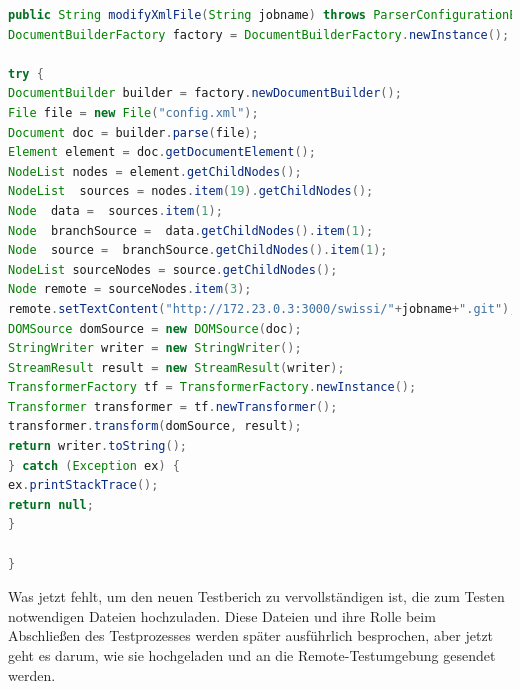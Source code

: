 \documentclass[a4paper,12pt,oneside]{book}
\begin{document}
\begin{lstlisting}[language=JAVA,caption=modifyXmlFil]
public String modifyXmlFile(String jobname) throws ParserConfigurationException, SAXException, IOException {
DocumentBuilderFactory factory = DocumentBuilderFactory.newInstance();

try {
DocumentBuilder builder = factory.newDocumentBuilder();
File file = new File("config.xml");
Document doc = builder.parse(file);
Element element = doc.getDocumentElement();
NodeList nodes = element.getChildNodes();
NodeList  sources = nodes.item(19).getChildNodes();
Node  data =  sources.item(1);
Node  branchSource =  data.getChildNodes().item(1);
Node  source =  branchSource.getChildNodes().item(1);
NodeList sourceNodes = source.getChildNodes();
Node remote = sourceNodes.item(3);
remote.setTextContent("http://172.23.0.3:3000/swissi/"+jobname+".git");
DOMSource domSource = new DOMSource(doc);
StringWriter writer = new StringWriter();
StreamResult result = new StreamResult(writer);
TransformerFactory tf = TransformerFactory.newInstance();
Transformer transformer = tf.newTransformer();
transformer.transform(domSource, result);
return writer.toString();    
} catch (Exception ex) {
ex.printStackTrace();
return null;
}

}
\end{lstlisting} 
Was jetzt fehlt, um den neuen Testberich zu vervollständigen ist, die zum Testen notwendigen Dateien hochzuladen. Diese Dateien und ihre Rolle beim Abschließen des Testprozesses werden später ausführlich besprochen, aber jetzt geht es darum, wie sie hochgeladen und an die Remote-Testumgebung gesendet werden.
\end{document}
